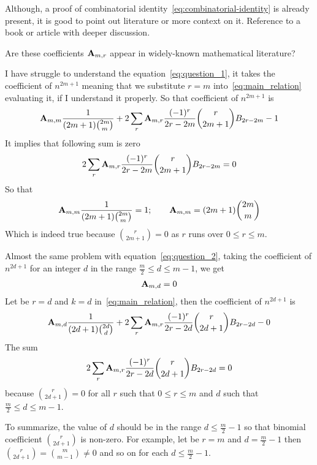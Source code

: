 \begin{question}
    Although, a proof of combinatorial identity~\eqref{eq:combinatorial-identity} is already present, it is good
    to point out literature or more context on it.
    Reference to a book or article with deeper discussion.
\end{question}
\begin{question}
    Are these coefficients ${\mathbf{A}} \sb{m,r}$ appear in widely-known mathematical literature?
\end{question}
\begin{question}
    \label{eq:question_2}
    I have struggle to understand the equation~\eqref{eq:question_1}, it takes the coefficient of $n^{2m+1}$ meaning that
    we substitute $r=m$ into~\eqref{eq:main_relation} evaluating it, if I understand it properly.
    So that coefficient of $n^{2m+1}$ is
    \begin{align*}
        {\mathbf{A}} \sb{m,m} \frac{1}{(2m+1) \binom{2m}{m}} + 2 \sum_{r} {\mathbf{A}} \sb{m,r} \frac{(-1)^r}{2r-2m} \binom{r}{2m+1} {B}\sb{2r-2m} - 1
    \end{align*}
    It implies that following sum is zero
    \begin{align*}
        2 \sum_{r} {\mathbf{A}} \sb{m,r} \frac{(-1)^r}{2r-2m} \binom{r}{2m+1} {B}\sb{2r-2m} = 0
    \end{align*}
    So that
    \begin{align*}
        {\mathbf{A}} \sb{m,m} \frac{1}{(2m+1) \binom{2m}m} = 1; \quad \quad {\mathbf{A}} \sb{m,m} = (2m+1)\binom{2m}{m}
    \end{align*}
    Which is indeed true because $\binom{r}{2m+1} = 0$ as $r$ runs over $0 \leq r \leq m$.
\end{question}
\begin{question}
    Almost the same problem with equation~\eqref{eq:question_2},
    taking the coefficient of $n^{2d+1}$ for an integer $d$ in the range $\frac{m}{2} \leq d \leq m-1$, we get
    \begin{align*}
        {\mathbf{A}} \sb{m,d} = 0
    \end{align*}
    Let be $r=d$ and $k=d$ in~\eqref{eq:main_relation}, then the coefficient of $n^{2d+1}$ is
    \begin{align*}
        {\mathbf{A}} \sb{m,d} \frac{1}{(2d+1) \binom{2d}{d}} + 2 \sum_{r} {\mathbf{A}} \sb{m,r} \frac{(-1)^r}{2r-2d} \binom{r}{2d+1} {B}\sb{2r-2d} - 0
    \end{align*}
    The sum
    \begin{align*}
        2 \sum_{r} {\mathbf{A}} \sb{m,r} \frac{(-1)^r}{2r-2d} \binom{r}{2d+1} {B}\sb{2r-2d} = 0
    \end{align*}
    because $\binom{r}{2d+1}=0$ for all $r$ such that $0 \leq r \leq m$ and $d$ such that $\frac{m}{2} \leq d \leq m-1$.
\end{question}
To summarize, the value of $d$ should be in the range $d \leq \frac{m}{2}-1$ so that binomial coefficient $\binom{r}{2d+1}$
is non-zero.
For example, let be $r=m$ and $d=\frac{m}{2}-1$ then $\binom{r}{2d+1} = \binom{m}{m-1} \neq 0$ and so on for each $d \leq \frac{m}{2}-1$.
